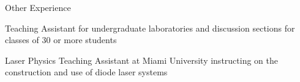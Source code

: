 \begin{cventries}
        \cventry
    {Other Experience} %
    {} %
    {} %
    {} %
    {
      \begin{cvitems} %
        \item {Teaching Assistant for undergraduate laboratories and discussion sections for classes of 30 or more students}
        \item {Laser Physics Teaching Assistant at Miami University instructing on the construction and use of diode laser systems}
      \end{cvitems}
    }    


\end{cventries}

